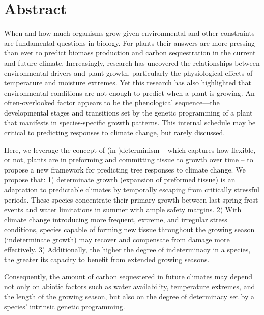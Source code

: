 \documentclass{article}
\begin{document}
\section*{Abstract} %
	When and how much organisms grow given environmental and other constraints are fundamental questions in biology. For plants their answers are more pressing than ever to predict biomass production and carbon sequestration in the current and future climate. Increasingly, research has uncovered the relationships between environmental drivers and plant growth, particularly the physiological effects of temperature and moisture extremes. Yet this research has also highlighted that environmental conditions are not enough to predict when a plant is growing. An often-overlooked factor appears to be the phenological sequence---the developmental stages and transitions set by the genetic programming of a plant that manifests in species-specific growth patterns. This internal schedule may be critical to predicting responses to climate change, but rarely discussed. 
	
	Here, we leverage the concept of (in-)determinism -- which captures how flexible, or not, plants are in preforming and committing tissue to growth over time -- to propose a new framework for predicting tree responses to climate change. We propose that: 1) determinate growth (expansion of preformed tissue) is an adaptation to predictable climates by temporally escaping from critically stressful periods. These species concentrate their primary growth between last spring frost events and water limitations in summer with ample safety margins. 2) With climate change introducing more frequent, extreme, and irregular stress conditions, species capable of forming new tissue throughout the growing season (indeterminate growth) may recover and compensate from damage more effectively. 3) Additionally, the higher the degree of indeterminacy in a species, the greater its capacity to benefit from extended growing seasons. 
	
	Consequently, the amount of carbon sequestered in future climates may depend not only on abiotic factors such as water availability, temperature extremes, and the length of the growing season, but also on the degree of determinacy set by a species' intrinsic genetic programming.\\
		
\end{document}
